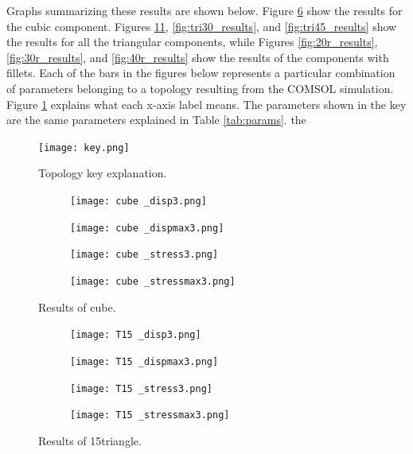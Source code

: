 \documentclass[../main.tex]{subfiles}
\begin{document}
Graphs summarizing these results are shown below. Figure \ref{fig:cuberesults} show the results for the cubic component. Figures \ref{fig:tri15_results}, \ref{fig:tri30_results}, and \ref{fig:tri45_results} show the results for all the triangular components, while Figures \ref{fig:20r_results}, \ref{fig:30r_results}, and \ref{fig:40r_results} show the results of the components with fillets. Each of the bars in the figures below represents a particular combination of parameters belonging to a topology resulting from the COMSOL simulation. Figure \ref{fig:key} explains what each x-axis label means. The parameters shown in the key are the same parameters explained in Table \ref{tab:params}. the

\begin{figure}[h!]
  \centering
  \texttt{[image: key.png]}
  \caption{Topology key explanation.}
  \label{fig:key}
  \end{figure}

\begin{figure}[h!]
  \centering 
  \begin{subfigure}[b]{0.45\textwidth}
    \centering 
    \texttt{[image: cube \_disp3.png]}
    \label{}
  \end{subfigure}
  \begin{subfigure}[b]{0.45\textwidth}
    \centering 
    \texttt{[image: cube \_dispmax3.png]}
    \label{}
  \end{subfigure}
  \begin{subfigure}[b]{0.45\textwidth}
    \centering 
    \texttt{[image: cube \_stress3.png]}
    \label{}
  \end{subfigure}
  \begin{subfigure}[b]{0.45\textwidth}
    \centering 
    \texttt{[image: cube \_stressmax3.png]}
    \label{}
  \end{subfigure}
  \caption{Results of cube.}
  \label{fig:cuberesults}
\end{figure}

\begin{figure}[h!]
  \centering 
  \begin{subfigure}[b]{0.45\textwidth}
    \centering 
    \texttt{[image: T15 \_disp3.png]}
    \label{}
  \end{subfigure}
  \begin{subfigure}[b]{0.45\textwidth}
    \centering 
    \texttt{[image: T15 \_dispmax3.png]}
    \label{}
  \end{subfigure}
  \begin{subfigure}[b]{0.45\textwidth}
    \centering 
    \texttt{[image: T15 \_stress3.png]}
    \label{}
  \end{subfigure}
  \begin{subfigure}[b]{0.45\textwidth}
    \centering 
    \texttt{[image: T15 \_stressmax3.png]}
    \label{}
  \end{subfigure}
  \caption{Results of 15\degree triangle.}
  \label{fig:tri15_results}
\end{figure}
\end{document}
